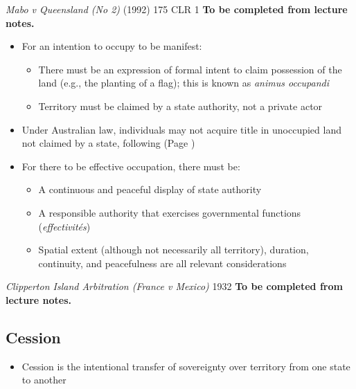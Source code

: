 \begin{casedetails}{\textit{Mabo v Queensland (No 2)} (1992) 175 CLR 1}
    \flushleft
    \textbf{To be completed from lecture notes.}
\end{casedetails}

\begin{itemize}
    \item For an intention to occupy to be manifest:
    \begin{itemize}
        \item There must be an expression of formal intent to claim possession of the land (e.g., the planting of a flag); this is known as \textit{animus occupandi}
        \item Territory must be claimed by a state authority, not a private actor
    \end{itemize}
    \item Under Australian law, individuals may not acquire title in unoccupied land not claimed by a state, following  (Page \pageref{case:Ure v Commonwealth})
    \item For there to be effective occupation, there must be:
    \begin{itemize}
        \item A continuous and peaceful display of state authority
        \item A responsible authority that exercises governmental functions (\textit{effectivités})
        \item Spatial extent (although not necessarily all territory), duration, continuity, and peacefulness are all relevant considerations
    \end{itemize}
\end{itemize}

\begin{casedetails}{\textit{Clipperton Island Arbitration (France v Mexico)} 1932}
    \flushleft
    \textbf{To be completed from lecture notes.}
\end{casedetails}

\subsection{Cession}
\begin{itemize}
    \item Cession is the intentional transfer of sovereignty over territory from one state to another
\end{itemize}

